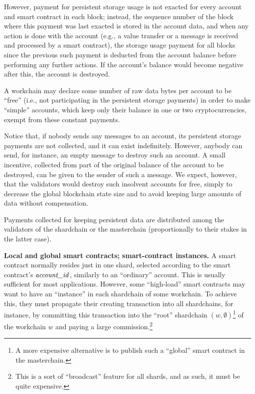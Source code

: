 \documentclass[12pt,oneside]{article}
\def\makepoint#1{\medbreak\noindent{\bf #1.\ }}
\def\nxsubpoint{\refstepcounter{subsubsection}%
  \smallbreak\makepoint{\thesubsubsection}}
\def\embt(#1.){\textbf{#1.}}
\let\vr=\textit
\def\accountid{\vr{account\_id\/}}
\begin{document}
However, payment for persistent storage usage is not exacted for every
account and smart contract in each block; instead, the sequence number
of the block where this payment was last exacted is stored in the
account data, and when any action is done with the account (e.g., a
value transfer or a message is received and processed by a smart
contract), the storage usage payment for all blocks since the previous
such payment is deducted from the account balance before performing
any further actions. If the account's balance would become negative
after this, the account is destroyed.

A workchain may declare some number of raw data bytes per account to
be ``free'' (i.e., not participating in the persistent storage
payments) in order to make ``simple'' accounts, which keep only their
balance in one or two cryptocurrencies, exempt from these constant
payments.

Notice that, if nobody sends any messages to an account, its
persistent storage payments are not collected, and it can exist
indefinitely. However, anybody can send, for instance, an empty
message to destroy such an account. A small incentive, collected from
part of the original balance of the account to be destroyed, can be
given to the sender of such a message. We expect, however, that the
validators would destroy such insolvent accounts for free, simply to
decrease the global blockchain state size and to avoid keeping large
amounts of data without compensation.

Payments collected for keeping persistent data are distributed among
the validators of the shardchain or the masterchain (proportionally to
their stakes in the latter case).

\nxsubpoint\label{sp:loc.glob.smct} \embt(Local and global smart
contracts; smart-contract instances.)  A smart contract normally
resides just in one shard, selected according to the smart contract's
$\accountid$, similarly to an ``ordinary'' account. This is usually
sufficient for most applications. However, some ``high-load'' smart
contracts may want to have an ``instance'' in each shardchain of some
workchain. To achieve this, they must propagate their creating
transaction into all shardchains, for instance, by committing this
transaction into the ``root'' shardchain $(w,\emptyset)$\footnote{A
  more expensive alternative is to publish such a ``global'' smart
  contract in the masterchain.} of the workchain $w$ and paying a
large commission.\footnote{This is a sort of ``broadcast'' feature for
  all shards, and as such, it must be quite expensive.}
\end{document}
